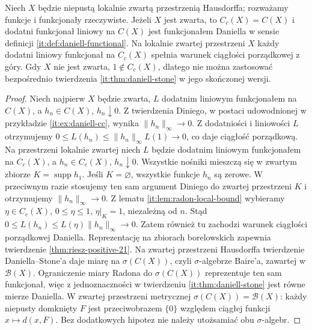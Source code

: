 \begin{lemat}
\label{lem:daniell-cc-order-32}
Niech $X$ będzie niepustą lokalnie zwartą przestrzenią Hausdorffa; rozważamy funkcje i funkcjonały rzeczywiste. Jeżeli $X$ jest zwarta, to $C_c(X)=C(X)$ i dodatni funkcjonał liniowy na $C(X)$ jest funkcjonałem Daniella w sensie definicji \ref{it:def:daniell-functional}. Na lokalnie zwartej przestrzeni $X$ każdy dodatni liniowy funkcjonał na $C_c(X)$ spełnia warunek ciągłości porządkowej z góry. Gdy $X$ nie jest zwarta, $1\notin C_c(X)$, dlatego nie można zastosować bezpośrednio twierdzenia \ref{it:thm:daniell-stone} w jego skończonej wersji.
\end{lemat}
\begin{proof}
Niech najpierw $X$ będzie zwarta, $L$ dodatnim liniowym funkcjonałem na $C(X)$, a $h_n\in C(X)$, $h_n\downarrow0$. Z twierdzenia Diniego, w postaci udowodnionej w przykładzie \ref{it:ex:daniell-cc}, wynika $\|h_n\|_\infty\to0$. Z dodatniości i liniowości $L$ otrzymujemy $0\le L(h_n)\le\|h_n\|_\infty L(1)\to0$, co daje ciągłość porządkową. Na przestrzeni lokalnie zwartej niech $L$ będzie dodatnim liniowym funkcjonałem na $C_c(X)$, a $h_n\in C_c(X)$, $h_n\downarrow0$. Wszystkie nośniki mieszczą się w zwartym zbiorze $K=\operatorname{supp}h_1$. Jeśli $K=\varnothing$, wszystkie funkcje $h_n$ są zerowe. W przeciwnym razie stosujemy ten sam argument Diniego do zwartej przestrzeni $K$ i otrzymujemy $\|h_n\|_\infty\to0$. Z lematu \ref{it:lem:radon-local-bound} wybieramy $\eta\in C_c(X)$, $0\le\eta\le1$, $\eta|_K=1$, niezależną od $n$. Stąd $0\le L(h_n)\le L(\eta)\|h_n\|_\infty\to0$. Zatem również tu zachodzi warunek ciągłości porządkowej Daniella. Reprezentację na zbiorach borelowskich zapewnia twierdzenie \ref{thm:riesz-positive-21}. Na zwartej przestrzeni Hausdorffa twierdzenie Daniella--Stone'a daje miarę na $\sigma(C(X))$, czyli $\sigma$-algebrze Baire'a, zawartej w $\mathcal B(X)$. Ograniczenie miary Radona do $\sigma(C(X))$ reprezentuje ten sam funkcjonał, więc z jednoznaczności w twierdzeniu \ref{it:thm:daniell-stone} jest równe mierze Daniella. W zwartej przestrzeni metrycznej $\sigma(C(X))=\mathcal B(X)$: każdy niepusty domknięty $F$ jest przeciwobrazem $\{0\}$ względem ciągłej funkcji $x\mapsto d(x,F)$. Bez dodatkowych hipotez nie należy utożsamiać obu $\sigma$-algebr.
\end{proof}
